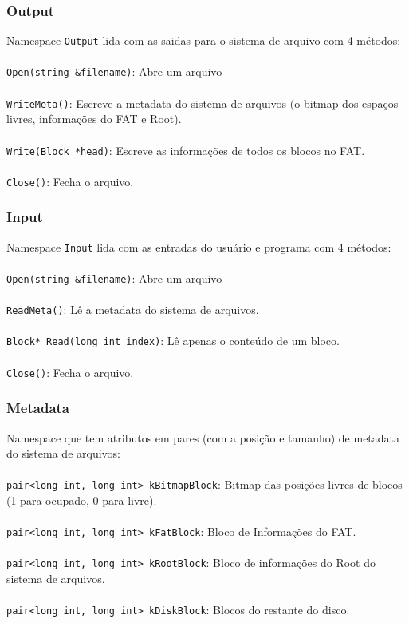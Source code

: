 \documentclass{beamer}
\begin{document}
\begin{frame}
  \frametitle{Output}
	Namespace \texttt{Output} lida com as saidas para o sistema de arquivo com 4 métodos:\\~\\

  \texttt{Open(string &filename)}: Abre um arquivo\\~\\
  \texttt{WriteMeta()}: Escreve a metadata do sistema de arquivos (o bitmap dos espaços livres, informações do FAT e Root). \\~\\
  \texttt{Write(Block *head)}: Escreve as informações de todos os blocos no FAT. \\~\\
  \texttt{Close()}: Fecha o arquivo.

\end{frame}

\begin{frame}
  \frametitle{Input}
  Namespace \texttt{Input} lida com as entradas do usuário e programa com 4 métodos:\\~\\
  
  \texttt{Open(string &filename)}: Abre um arquivo\\~\\
  \texttt{ReadMeta()}: Lê a metadata do sistema de arquivos. \\~\\
  \texttt{Block* Read(long int index)}: Lê apenas o conteúdo de um bloco. \\~\\
  \texttt{Close()}: Fecha o arquivo.
\end{frame}

\begin{frame}
  \frametitle{Metadata}
  Namespace que tem atributos em pares (com a posição e tamanho) de metadata do sistema de arquivos:\\~\\

  \texttt{pair<long int, long int> kBitmapBlock}: Bitmap das posições livres de blocos (1 para ocupado, 0 para livre).\\~\\
  \texttt{pair<long int, long int> kFatBlock}: Bloco de Informações do FAT. \\~\\
  \texttt{pair<long int, long int> kRootBlock}: Bloco de informações do Root do sistema de arquivos.\\~\\
  \texttt{pair<long int, long int> kDiskBlock}: Blocos do restante do disco.
\end{frame}
\end{document}
